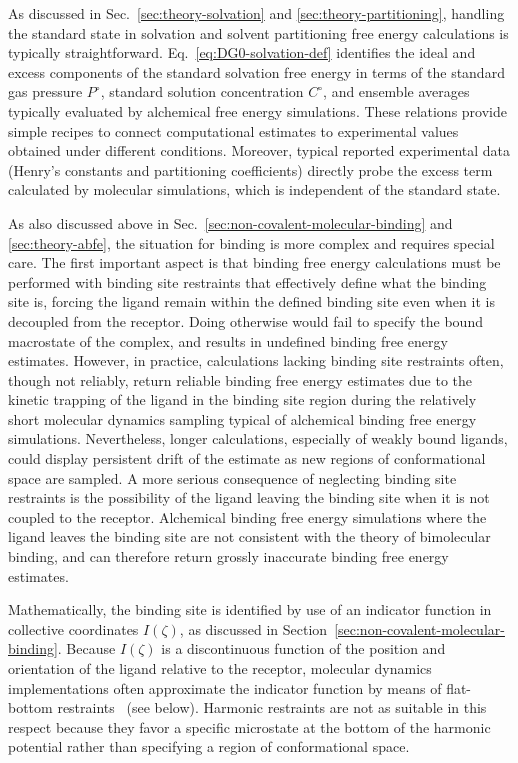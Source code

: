 \documentclass[9pt,bestpractices]{livecoms}
\begin{document}
As discussed in Sec.~\ref{sec:theory-solvation} and \ref{sec:theory-partitioning}, handling the standard state in solvation and solvent partitioning free energy calculations is typically straightforward. Eq.~\ref{eq:DG0-solvation-def} identifies the ideal and excess components of the standard solvation free energy in terms of the standard gas pressure $P^\circ$, standard solution concentration $C^\circ$, and ensemble averages typically evaluated by alchemical free energy simulations. These relations provide simple recipes to connect computational estimates to experimental values obtained under different conditions. Moreover, typical reported experimental data (Henry's constants and partitioning coefficients) directly probe the excess term calculated by molecular simulations, which is independent of the standard state.

As also discussed above in Sec.~\ref{sec:non-covalent-molecular-binding} and \ref{sec:theory-abfe}, the situation for binding is more complex and requires special care. The first important aspect is that binding free energy calculations must be performed with binding site restraints that effectively define what the binding site is, forcing the ligand remain within the defined binding site even when it is decoupled from the receptor. Doing otherwise would fail to specify the bound macrostate of the complex, and results in undefined binding free energy estimates. However, in practice, calculations lacking binding site restraints often, though not reliably, return reliable binding free energy estimates due to the kinetic trapping of the ligand in the binding site region during the relatively short molecular dynamics sampling typical of alchemical binding free energy simulations. Nevertheless, longer calculations, especially of weakly bound ligands, could display persistent drift of the estimate as new regions of conformational space are sampled. A more serious consequence of neglecting binding site restraints is the possibility of the ligand leaving the binding site when it is not coupled to the receptor. Alchemical binding free energy simulations where the ligand leaves the binding site are not consistent with the theory of bimolecular binding, and can therefore return grossly inaccurate binding free energy estimates.

Mathematically, the binding site is identified by use of an indicator function in collective coordinates $I(\zeta)$, as discussed in Section~\ref{sec:non-covalent-molecular-binding}. Because $I(\zeta)$ is a discontinuous function of the position and orientation of the ligand relative to the receptor, molecular dynamics implementations often approximate the indicator function by means of flat-bottom restraints~\cite{chen2007can, wu2021alchemical} (see below). Harmonic restraints are not as suitable in this respect because they favor a specific microstate at the bottom of the harmonic potential rather than specifying a region of conformational space.
\end{document}
